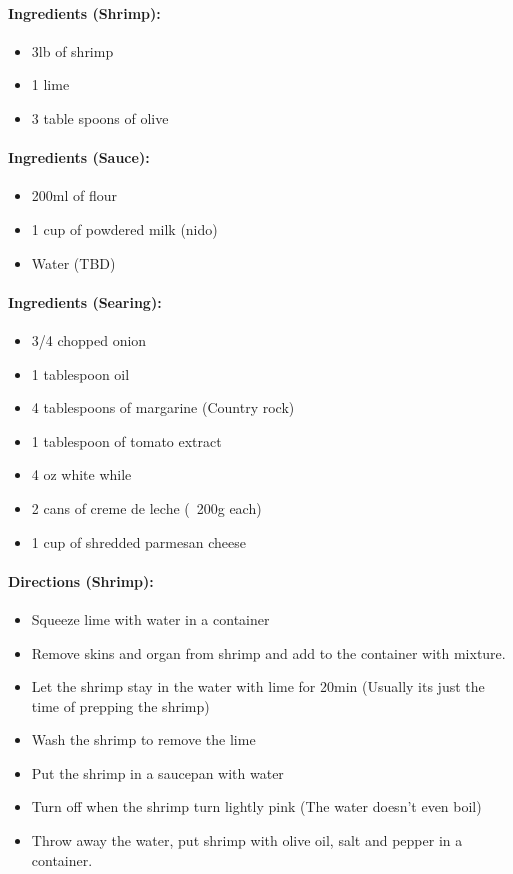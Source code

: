 \documentclass{article}
\begin{document}
\paragraph{Ingredients (Shrimp):}
\begin{itemize}
    \item 3lb of shrimp
    \item 1 lime
    \item 3 table spoons of olive
\end{itemize}  

\paragraph{Ingredients (Sauce):}
\begin{itemize}
    \item 200ml of flour
    \item 1 cup of powdered milk (nido)
    \item Water (TBD)
\end{itemize}  

\paragraph{Ingredients (Searing):}
\begin{itemize}
    \item 3/4 chopped onion
    \item 1 tablespoon oil
    \item 4 tablespoons of margarine (Country rock)
    \item 1 tablespoon of tomato extract
    \item 4 oz white while
    \item 2 cans of creme de leche (~200g each)
    \item 1 cup of shredded parmesan cheese
\end{itemize}  

\paragraph{Directions (Shrimp):}
\begin{itemize}
    \item Squeeze lime with water in a container
    \item Remove skins and organ from shrimp and add to the container with mixture.
    \item Let the shrimp stay in the water with lime for 20min (Usually its just the time of prepping the shrimp)
    \item Wash the shrimp to remove the lime
    \item Put the shrimp in a saucepan with water
    \item Turn off when the shrimp turn lightly pink (The water doesn't even boil)
    \item Throw away the water, put shrimp with olive oil, salt and pepper in a container.
\end{itemize}  
\end{document}
